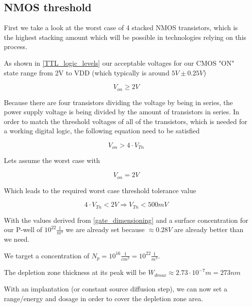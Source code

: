 \subsection{NMOS threshold}\label{nmos_dimensioning}
First we take a look at the worst case of 4 stacked NMOS transistors, which is the highest stacking amount which will be possible in technologies relying on this process.


As shown in  \autoref{TTL_logic_levels} our acceptable voltages for our CMOS "ON" state range from 2V to VDD (which typically is around $5V\pm0.25V$)

\begin{equation}
V_{on} \geq 2V
\end{equation}

Because there are four transistors dividing the voltage by being in series, the power supply voltage is being divided by the amount of transistors in series.
In order to match the threshold voltages of all of the transistors, which is needed for a working digital logic, the following equation need to be satisfied

\begin{equation}
V_{on} > 4 \cdot V_{Tn}
\end{equation}

Lets assume the worst case with

\begin{equation}
V_{on} = 2V
\end{equation}

Which leads to the required worst case threshold tolerance value

\begin{equation}
4 \cdot V_{Tn} < 2V
\Rightarrow
V_{Tn} < 500mV
\end{equation}
 
With the values derived from \autoref{gate_dimensioning} and a surface concentration for our P-well of $10^{22}\frac{1}{m^3}$ we are already set because $\approx 0.28V$ are already better than we need.

We target a concentration of $N_p = 10^{16}\frac{1}{cm^3}=10^{22}\frac{1}{m^3}$.

The depletion zone thickness at its peak will be $W_{dmax} \approx 2.73 \cdot 10^{-7} m = 273 nm$

With an implantation (or constant source diffusion step), we can now set a range/energy and dosage in order to cover the depletion zone area.

